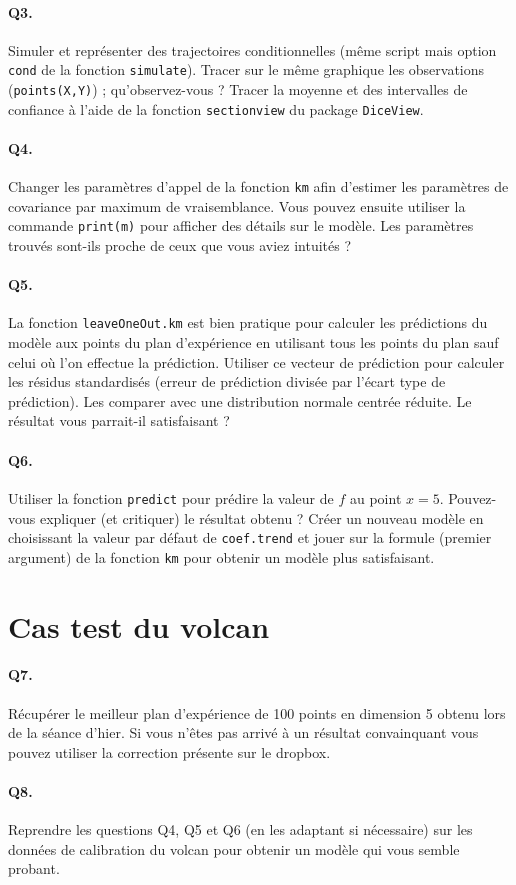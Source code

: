 \documentclass[12pt]{scrartcl}
\begin{document}
\paragraph{Q3.} Simuler et représenter des trajectoires conditionnelles (même script mais option \texttt{cond} de la fonction \texttt{simulate}). Tracer sur le même graphique les observations (\texttt{points(X,Y)}) ; qu'observez-vous ?
Tracer la moyenne et des intervalles de confiance à l'aide de la fonction \texttt{sectionview} du package \texttt{DiceView}.

\paragraph{Q4.} Changer les paramètres d'appel de la fonction \texttt{km} afin d'estimer les paramètres de covariance par maximum de vraisemblance. 
Vous pouvez ensuite utiliser la commande \texttt{print(m)} pour afficher des détails sur le modèle. Les paramètres trouvés sont-ils proche de ceux que vous aviez intuités ?

\paragraph{Q5.} La fonction \texttt{leaveOneOut.km} est bien pratique pour calculer les prédictions du modèle aux points du plan d'expérience en utilisant tous les points du plan sauf celui où l'on effectue la prédiction. Utiliser ce vecteur de prédiction pour calculer les résidus standardisés (erreur de prédiction divisée par l'écart type de prédiction). Les comparer avec une distribution normale centrée réduite. Le résultat vous parrait-il satisfaisant ?  

\paragraph{Q6.} Utiliser la fonction \texttt{predict} pour prédire la valeur de $f$ au point $x=5$. Pouvez-vous expliquer (et critiquer) le résultat obtenu ? Créer un nouveau modèle en choisissant la valeur par défaut de \texttt{coef.trend} et jouer sur la formule (premier argument) de la fonction \texttt{km} pour obtenir un modèle plus satisfaisant.

\section{Cas test du volcan}

\paragraph{Q7.} Récupérer le meilleur plan d'expérience de 100 points en dimension 5 obtenu lors de la séance d'hier. Si vous n'êtes pas arrivé à un résultat convainquant vous pouvez utiliser la correction présente sur le dropbox.

\paragraph{Q8.} Reprendre les questions Q4, Q5 et Q6 (en les adaptant si nécessaire) sur les données de calibration du volcan pour obtenir un modèle qui vous semble probant.
\end{document}
